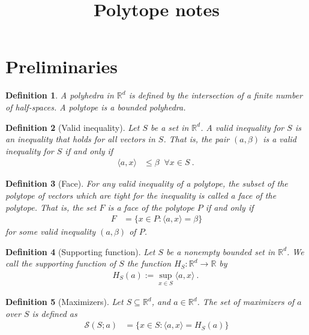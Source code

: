 \documentclass[12pt]{article}
\title{Polytope notes}
\date{}
\newcommand{\reals}{\mathbb{R}}
\newcommand{\inprod}[2]{\langle #1, #2 \rangle}%
\newtheorem{definition}{Definition}
\begin{document}
\maketitle

\section{Preliminaries}
\begin{definition}
	A \emph{polyhedra} in $\reals^d$ is defined by the intersection of a finite number of half-spaces.
	A \emph{polytope} is a bounded polyhedra.
\end{definition}

\begin{definition}[Valid inequality]
	Let $S$ be a set in $\reals^d$.
	A \emph{valid inequality} for $S$ is an inequality that holds for all vectors in $S$.
	That is, the pair $(a,\beta)$ is a valid inequality for $S$ if and only if 
	\begin{align*}
	\inprod{a}{x} &\leq \beta \; \; \forall x \in S~.~
	\end{align*}
\end{definition}

\begin{definition}[Face]\label{def:face}
	For any valid inequality of a polytope, the subset of the polytope of vectors which are tight for the inequality is called a \emph{face} of the polytope.
	That is, the set $F$ is a face of the polytope $P$ if and only if 
	\begin{align*}
	F &= \{x \in P : \inprod{a}{x} = \beta \}
	\end{align*}
	for some valid inequality $(a, \beta)$ of $P$.
\end{definition}

\begin{definition}[Supporting function]
	Let $S$ be a nonempty bounded set in $\reals^d$.
	We call the \emph{supporting function} of $S$ the function $H_S:\reals^d \to \reals$ by
	\begin{align*}
	H_S(a) := \sup_{x \in S}\inprod{a}{x}~.~
	\end{align*} 
\end{definition}

\begin{definition}[Maximizers]
  Let $S \subseteq \reals^d$, and $a \in \reals^d$.
  The \emph{set of maximizers} of $a$ over $S$ is defined as
  \begin{align*}
    \mathcal{S}(S;a) &= \{x \in S : \inprod a x = H_S(a)\}
  \end{align*}
\end{definition}
\end{document}
